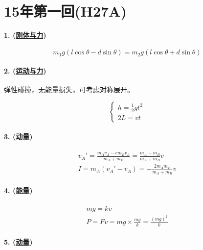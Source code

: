 
\section{15年第一回(H27A)}

\paragraph{1. (\hyperref[subsec:刚体与力]{刚体与力})}

\begin{equation*}
    m_1g(l\cos\theta-d\sin\theta)=m_2g(l\cos\theta+d\sin\theta)
\end{equation*}

\paragraph{2. (\hyperref[subsec:运动与力]{运动与力})} 弹性碰撞，无能量损失，可考虑对称展开。

\begin{equation*}
    \begin{cases}
        h=\frac12gt^2\\
        2L=vt
    \end{cases}
\end{equation*}

\paragraph{3. (\hyperref[subsec:动量]{动量})}

\begin{gather*}
    v_A'=\frac{m_Av_A-em_Bv_A}{m_A+m_B}=\frac{m_A-m_B}{m_A+m_B}v\\
    I=m_A(v_A'-v_A)=-\frac{2m_Am_B}{m_A+m_B}v
\end{gather*}

\paragraph{4. (\hyperref[subsec:能量]{能量})}

\begin{gather*}
    mg=kv\\
    P=Fv=mg\times\frac{mg}{k}=\frac{(mg)^2}{k}
\end{gather*}

\paragraph{5. (\hyperref[subsec:动量]{动量})}

